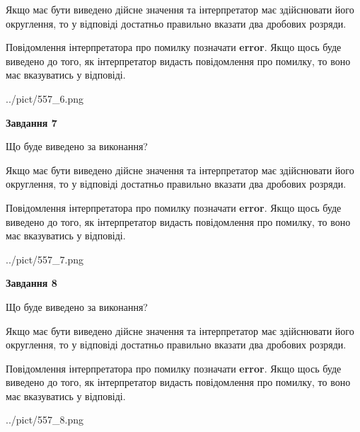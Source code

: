 \documentclass[12pt, ukrainian]{article}
\begin{document}
{\begin {Large}
Якщо має бути виведено дійсне значення та інтерпретатор має здійснювати його округлення, 
то у відповіді достатньо правильно вказати два дробових розряди.

Повідомлення інтерпретатора про помилку позначати \textbf{error}.
Якщо щось буде виведено до того, як інтерпретатор видасть повідомлення про помилку, 
то воно має вказуватись у відповіді. \par

\begin{center}
	{../pict/557_6.png}
\end{center}
\newpage

{\begin {center}\textbf{Завдання 7}\end {center}}\par
Що буде виведено за виконання? \par

Якщо має бути виведено дійсне значення та інтерпретатор має здійснювати його округлення, 
то у відповіді достатньо правильно вказати два дробових розряди.

Повідомлення інтерпретатора про помилку позначати \textbf{error}.
Якщо щось буде виведено до того, як інтерпретатор видасть повідомлення про помилку, 
то воно має вказуватись у відповіді. \par

\begin{center}
	{../pict/557_7.png}
\end{center}
\newpage

{\begin {center}\textbf{Завдання 8}\end {center}}\par
Що буде виведено за виконання? \par

Якщо має бути виведено дійсне значення та інтерпретатор має здійснювати його округлення, 
то у відповіді достатньо правильно вказати два дробових розряди.

Повідомлення інтерпретатора про помилку позначати \textbf{error}.
Якщо щось буде виведено до того, як інтерпретатор видасть повідомлення про помилку, 
то воно має вказуватись у відповіді. \par

\begin{center}
	{../pict/557_8.png}
\end{center}
\newpage


\end{Large}}
\end{document}
